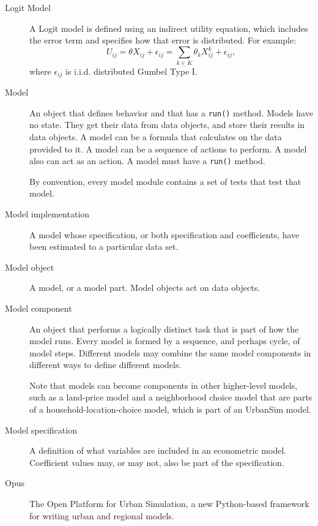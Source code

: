 \begin{description}
\item[Logit Model]  
A Logit model is defined using an indirect utility equation, which
includes the error term and specifies how that error is
distributed. For example:
\begin{equation}
    U_{ij}={\theta}{X}_{ij}+\epsilon_{ij}
    =\sum_{k \in K}{\theta}_{k}X^{k}_{ij}+\epsilon_{ij},
\end{equation}
\indent where $\epsilon_{ij}$ is i.i.d. distributed Gumbel Type I.

\item[Model] 
An object that defines behavior and that has a \verb|run()|
method.  Models have no state. They get their data from data
objects, and store their results in data objects.  A model can be
a formula that calculates on the data provided to it. A model can
be a sequence of actions to perform.  A model also can act as an
action.  A model must have a \verb|run()| method.

By convention, every model
module contains a set of tests that test that model.

\item[Model implementation] 
A model whose specification, or both specification and
coefficients, \coefficientsindex have been estimated to a particular data set.

\item[Model object] 
A model, or a model part.  Model objects act on data objects.

\item[Model component] 
An object that performs a logically distinct task that is part of
how the model runs.  Every model is formed by a sequence, and
perhaps cycle, of model steps.  Different models may 
combine the same model components in different ways to define
different models.

Note that models can become components in other higher-level models, such as a
land-price model and a neighborhood choice model that are parts of a
household-location-choice model, which is part of an UrbanSim model.

\item[Model specification] 
A definition of what variables are included in an econometric
model.  Coefficient \coefficientsindex values may, or may not, also be part of the
specification.

\item[Opus]  The Open Platform for Urban Simulation, a new
Python-based \pythonindex framework for writing urban and regional models.


\end{description}
